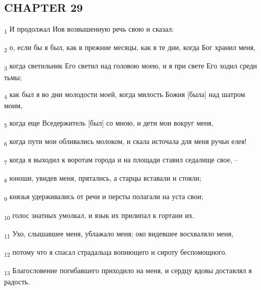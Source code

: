 \subsection{CHAPTER 29}
\begin{tcolorbox}
\textsubscript{1} И продолжал Иов возвышенную речь свою и сказал:
\end{tcolorbox}
\begin{tcolorbox}
\textsubscript{2} о, если бы я был, как в прежние месяцы, как в те дни, когда Бог хранил меня,
\end{tcolorbox}
\begin{tcolorbox}
\textsubscript{3} когда светильник Его светил над головою моею, и я при свете Его ходил среди тьмы;
\end{tcolorbox}
\begin{tcolorbox}
\textsubscript{4} как был я во дни молодости моей, когда милость Божия [была] над шатром моим,
\end{tcolorbox}
\begin{tcolorbox}
\textsubscript{5} когда еще Вседержитель [был] со мною, и дети мои вокруг меня,
\end{tcolorbox}
\begin{tcolorbox}
\textsubscript{6} когда пути мои обливались молоком, и скала источала для меня ручьи елея!
\end{tcolorbox}
\begin{tcolorbox}
\textsubscript{7} когда я выходил к воротам города и на площади ставил седалище свое, --
\end{tcolorbox}
\begin{tcolorbox}
\textsubscript{8} юноши, увидев меня, прятались, а старцы вставали и стояли;
\end{tcolorbox}
\begin{tcolorbox}
\textsubscript{9} князья удерживались от речи и персты полагали на уста свои;
\end{tcolorbox}
\begin{tcolorbox}
\textsubscript{10} голос знатных умолкал, и язык их прилипал к гортани их.
\end{tcolorbox}
\begin{tcolorbox}
\textsubscript{11} Ухо, слышавшее меня, ублажало меня; око видевшее восхваляло меня,
\end{tcolorbox}
\begin{tcolorbox}
\textsubscript{12} потому что я спасал страдальца вопиющего и сироту беспомощного.
\end{tcolorbox}
\begin{tcolorbox}
\textsubscript{13} Благословение погибавшего приходило на меня, и сердцу вдовы доставлял я радость.
\end{tcolorbox}

